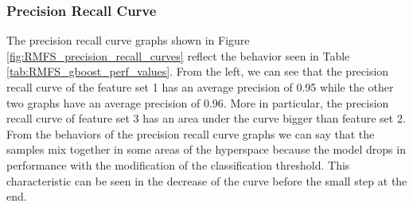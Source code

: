 \documentclass[../../Thesis.tex]{subfiles}
\begin{document}
			\subsubsection{Precision Recall Curve}
				The precision recall curve graphs shown in Figure \ref{fig:RMFS_precision_recall_curves} reflect the behavior seen in Table \ref{tab:RMFS_gboost_perf_values}. From the left, we can see that the precision recall curve of the feature set 1 has an average precision of 0.95 while the other two graphs have an average precision of 0.96. More in particular, the precision recall curve of feature set 3 has an area under the curve bigger than feature set 2. \\
				From the behaviors of the precision recall curve graphs we can say that the samples mix together in some areas of the hyperspace because the model drops in performance with the modification of the classification threshold. This characteristic can be seen in the decrease of the curve before the small step at the end. 
\end{document}
